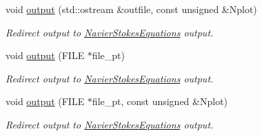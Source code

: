 \begin{DoxyCompactItemize}
void \hyperlink{classoomph_1_1PolarTaylorHoodElement_acca69fdd471868d493ec2087f81a7188}{output} (std\+::ostream \&outfile, const unsigned \&Nplot)
\begin{DoxyCompactList}\small\item\em Redirect output to \hyperlink{classoomph_1_1NavierStokesEquations}{Navier\+Stokes\+Equations} output. \end{DoxyCompactList}\item 
void \hyperlink{classoomph_1_1PolarTaylorHoodElement_ab1d58fc5d344421bdf29ea11514accb6}{output} (F\+I\+LE $\ast$file\+\_\+pt)
\begin{DoxyCompactList}\small\item\em Redirect output to \hyperlink{classoomph_1_1NavierStokesEquations}{Navier\+Stokes\+Equations} output. \end{DoxyCompactList}\item 
void \hyperlink{classoomph_1_1PolarTaylorHoodElement_a491915435066f5545da449fd2ac5e3a7}{output} (F\+I\+LE $\ast$file\+\_\+pt, const unsigned \&Nplot)
\begin{DoxyCompactList}\small\item\em Redirect output to \hyperlink{classoomph_1_1NavierStokesEquations}{Navier\+Stokes\+Equations} output. \end{DoxyCompactList}\end{DoxyCompactItemize}
